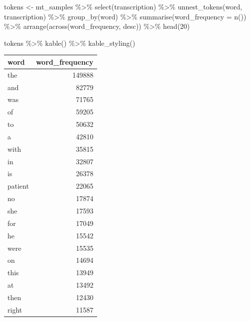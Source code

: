 \documentclass[
]{article}
\newenvironment{Shaded}{\begin{snugshade}}{\end{snugshade}}
\newcommand{\AttributeTok}[1]{\textcolor[rgb]{0.77,0.63,0.00}{#1}}
\newcommand{\DecValTok}[1]{\textcolor[rgb]{0.00,0.00,0.81}{#1}}
\newcommand{\FunctionTok}[1]{\textcolor[rgb]{0.00,0.00,0.00}{#1}}
\newcommand{\NormalTok}[1]{#1}
\newcommand{\OtherTok}[1]{\textcolor[rgb]{0.56,0.35,0.01}{#1}}
\newcommand{\SpecialCharTok}[1]{\textcolor[rgb]{0.00,0.00,0.00}{#1}}
\begin{document}
\begin{Shaded}
\begin{Highlighting}[]
\NormalTok{tokens }\OtherTok{\textless{}{-}}\NormalTok{ mt\_samples }\SpecialCharTok{\%\textgreater{}\%}
  \FunctionTok{select}\NormalTok{(transcription) }\SpecialCharTok{\%\textgreater{}\%}
  \FunctionTok{unnest\_tokens}\NormalTok{(word, transcription) }\SpecialCharTok{\%\textgreater{}\%}
  \FunctionTok{group\_by}\NormalTok{(word) }\SpecialCharTok{\%\textgreater{}\%}
  \FunctionTok{summarise}\NormalTok{(}\AttributeTok{word\_frequency =} \FunctionTok{n}\NormalTok{()) }\SpecialCharTok{\%\textgreater{}\%}
  \FunctionTok{arrange}\NormalTok{(}\FunctionTok{across}\NormalTok{(word\_frequency, desc)) }\SpecialCharTok{\%\textgreater{}\%}
  \FunctionTok{head}\NormalTok{(}\DecValTok{20}\NormalTok{)}

\NormalTok{tokens }\SpecialCharTok{\%\textgreater{}\%}
  \FunctionTok{kable}\NormalTok{() }\SpecialCharTok{\%\textgreater{}\%}
  \FunctionTok{kable\_styling}\NormalTok{()}
\end{Highlighting}
\end{Shaded}

\begin{table}
\centering
\begin{tabular}{l|r}
\hline
word & word\_frequency\\
\hline
the & 149888\\
\hline
and & 82779\\
\hline
was & 71765\\
\hline
of & 59205\\
\hline
to & 50632\\
\hline
a & 42810\\
\hline
with & 35815\\
\hline
in & 32807\\
\hline
is & 26378\\
\hline
patient & 22065\\
\hline
no & 17874\\
\hline
she & 17593\\
\hline
for & 17049\\
\hline
he & 15542\\
\hline
were & 15535\\
\hline
on & 14694\\
\hline
this & 13949\\
\hline
at & 13492\\
\hline
then & 12430\\
\hline
right & 11587\\
\hline
\end{tabular}
\end{table}
\end{document}
